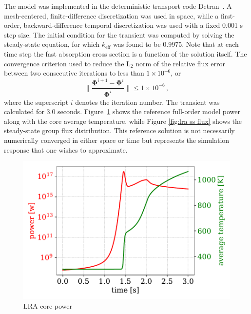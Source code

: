 \documentclass[]{interact}
\theoremstyle{plain}%
\theoremstyle{definition}
\theoremstyle{remark}
\begin{document}
The model was implemented in the deterministic transport code Detran~\cite{roberts2014advanced}.
A mesh-centered, finite-difference discretization was used in space, while a first-order, backward-difference temporal discretization was used with a fixed 0.001 s step size.  
The initial condition for the transient was computed by solving the steady-state equation, for which $k_{\text{eff}}$ was found to be 0.9975.
Note that at each time step the fast absorption cross section is a function of the solution itself.
The convergence criterion used to reduce the $\text{L}_2$ norm  of the relative flux error between two consecutive iterations to less than $1\times 10^{-6}$, or
\begin{equation}
	\|\frac{\mathbf{\Phi}^{i+1} - \mathbf{\Phi}^{i}} {\mathbf{\Phi}^i}\| \le  1\times 10^{-6} \, ,
	\label{eq:convergance criteria} 
\end{equation}
where the superscript $i$ denotes the iteration number.
The transient was calculated for 3.0 seconds.
Figure~\ref{fig:lra fom power} shows the reference full-order model power along with the core average temperature, while Figure \ref{fig:lra ss flux} shows the steady-state group flux distribution.
This reference solution is not necessarily numerically converged in either space or time but represents the simulation response that one wishes to approximate.
\begin{figure}[h!]
	\includegraphics[width=1.0\linewidth]{../figures/LRA_fom_power_temperature.pdf}
	\caption{LRA core power}
	\label{fig:lra fom power}
\end{figure}

\end{document}
